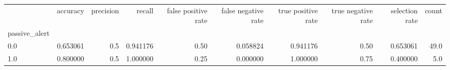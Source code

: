 \begin{tabular}{lrrrrrrrrr}
\toprule
{} &  accuracy &  precision &    recall &  false positive rate &  false negative rate &  true positive rate &  true negative rate &  selection rate &  count \\
passive\_alert &           &            &           &                      &                      &                     &                     &                 &        \\
\midrule
0.0           &  0.653061 &        0.5 &  0.941176 &                 0.50 &             0.058824 &            0.941176 &                0.50 &        0.653061 &   49.0 \\
1.0           &  0.800000 &        0.5 &  1.000000 &                 0.25 &             0.000000 &            1.000000 &                0.75 &        0.400000 &    5.0 \\
\bottomrule
\end{tabular}
